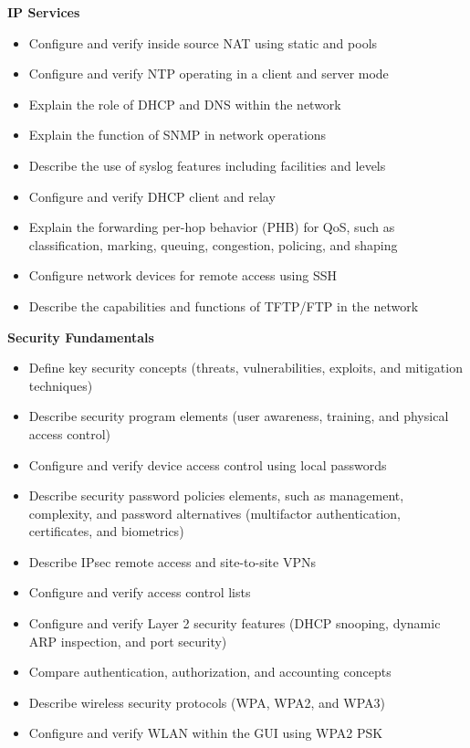 \documentclass{article}
\begin{document}
\begin{flushleft}\textbf{IP Services}\end{flushleft}
\begin{itemize}
  \item Configure and verify inside source NAT using static and pools
  \item Configure and verify NTP operating in a client and server mode
  \item Explain the role of DHCP and DNS within the network
  \item Explain the function of SNMP in network operations
  \item Describe the use of syslog features including facilities and levels
  \item Configure and verify DHCP client and relay
  \item Explain the forwarding per-hop behavior (PHB) for QoS, such as classification, marking, queuing, congestion, policing, and shaping
  \item Configure network devices for remote access using SSH
  \item Describe the capabilities and functions of TFTP/FTP in the network\\
\end{itemize}



\begin{flushleft}\textbf{Security Fundamentals}\end{flushleft}
\begin{itemize}
  \item Define key security concepts (threats, vulnerabilities, exploits, and mitigation techniques)
  \item Describe security program elements (user awareness, training, and physical access control)
  \item Configure and verify device access control using local passwords
  \item Describe security password policies elements, such as management, complexity, and password alternatives (multifactor authentication, certificates, and biometrics)
  \item Describe IPsec remote access and site-to-site VPNs
  \item Configure and verify access control lists
  \item Configure and verify Layer 2 security features (DHCP snooping, dynamic ARP inspection, and port security)
  \item Compare authentication, authorization, and accounting concepts
  \item Describe wireless security protocols (WPA, WPA2, and WPA3)
  \item Configure and verify WLAN within the GUI using WPA2 PSK\\
\end{itemize}
\end{document}
